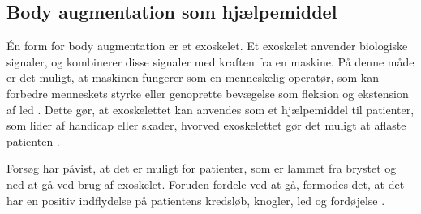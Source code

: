 \subsection{Body augmentation som hjælpemiddel}
Én form for body augmentation er et exoskelet. Et exoskelet  anvender biologiske signaler, og kombinerer disse signaler med kraften fra en maskine. På denne måde er det muligt, at maskinen fungerer som en menneskelig operatør, som kan forbedre menneskets styrke eller genoprette bevægelse som fleksion og ekstension af led \citep{yang2008}. Dette gør, at exoskelettet kan anvendes som et hjælpemiddel til patienter, som lider af handicap eller skader, hvorved exoskelettet gør det muligt at aflaste patienten \citep{bogue2015}.  

Forsøg har påvist, at det er muligt for patienter, som er lammet fra brystet og ned at gå ved brug af exoskelet. Foruden fordele ved at gå, formodes det, at det har en positiv indflydelse på patientens kredsløb, knogler, led og fordøjelse \citep{regmidt2015}. 